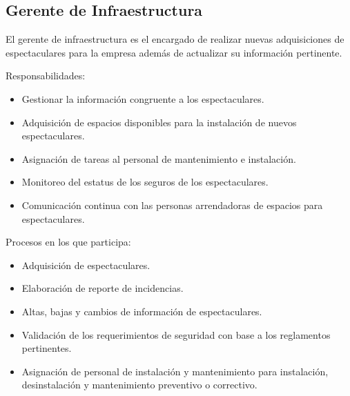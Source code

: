 \begin{Usuario}{\subsection{Gerente de Infraestructura}}{
	El gerente de infraestructura es el encargado de realizar nuevas adquisiciones de espectaculares para la empresa además de actualizar su información pertinente.\\
}
    \item[Responsabilidades:] \cdtEmpty
    \begin{itemize}
        \item Gestionar la información congruente a los espectaculares.
		\item Adquisición de espacios disponibles para la instalación de nuevos espectaculares.
		\item Asignación de tareas al personal de mantenimiento e instalación.
		\item Monitoreo del estatus de los seguros de los espectaculares.
		\item Comunicación continua con las personas arrendadoras de espacios para espectaculares.
	\end{itemize}

	\item[Procesos en los que participa:] \cdtEmpty
    \begin{itemize}
		\item Adquisición de espectaculares.
		\item Elaboración de reporte de incidencias.
		\item Altas, bajas y cambios de información de espectaculares.
		\item Validación de los requerimientos de seguridad con base a los reglamentos pertinentes.
		\item Asignación de personal de instalación y mantenimiento para instalación, desinstalación y mantenimiento preventivo o correctivo.
    \end{itemize}
\end{Usuario}


